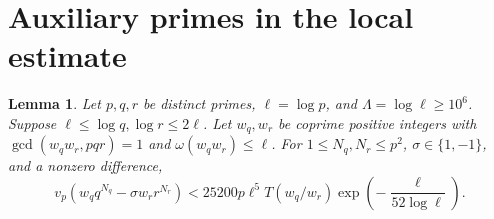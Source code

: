 \documentclass{amsart}
\newtheorem{lemma}{Lemma}[section]
\theoremstyle{remark}
\numberwithin{equation}{section}
\begin{document}
\section{Auxiliary primes in the local estimate}\label{sec:aux}
\begin{lemma}\label{lem:aux}
Let $p,q,r$ be distinct primes, $\ell=\log p$, and $\Lambda=\log\ell\ge10^6$.
Suppose $\ell\le\log q,\log r\le2\ell$.
Let $w_q,w_r$ be coprime positive integers with
$\gcd(w_qw_r,pqr)=1$ and $\omega(w_qw_r)\le\ell$.
For $1\le N_q,N_r\le p^2$, $\sigma\in\{1,-1\}$, and a nonzero difference,
\begin{equation}\label{eq:auxbound}
v_p(w_qq^{N_q}-\sigma w_rr^{N_r})
 <25200p\ell^5T(w_q/w_r)
                     \exp\!\left(-\frac{\ell}{52\log\ell}\right).
\end{equation}
\end{lemma}
\end{document}
